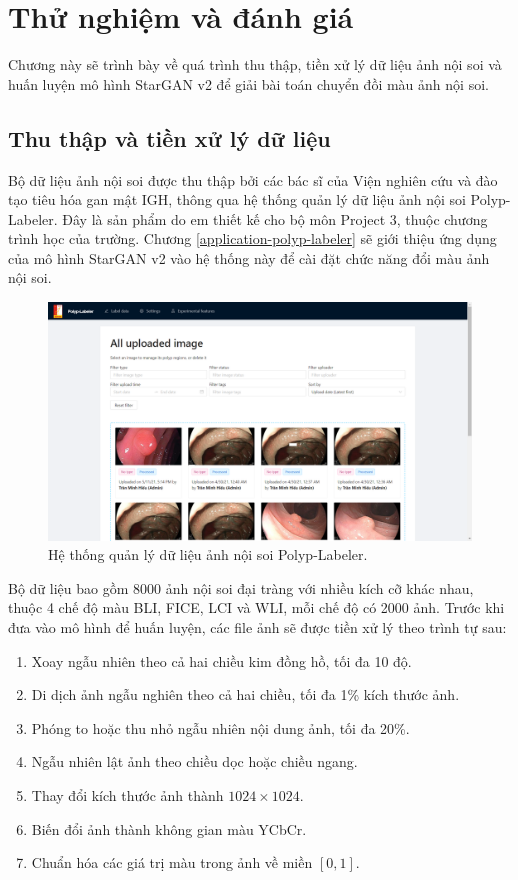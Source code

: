 \documentclass[12pt]{extreport}
\begin{document}
\chapter{Thử nghiệm và đánh giá}

Chương này sẽ trình bày về quá trình thu thập, tiền xử lý dữ liệu ảnh nội soi và huấn luyện mô hình StarGAN v2 để giải bài toán chuyển đồi màu ảnh nội soi.

\section{Thu thập và tiền xử lý dữ liệu}

Bộ dữ liệu ảnh nội soi được thu thập bởi các bác sĩ của Viện nghiên cứu và đào tạo tiêu hóa gan mật IGH, thông qua hệ thống quản lý dữ liệu ảnh nội soi Polyp-Labeler. Đây là sản phẩm do em thiết kế cho bộ môn Project 3, thuộc chương trình học của trường. Chương \ref{application-polyp-labeler} sẽ giới thiệu ứng dụng của mô hình StarGAN v2 vào hệ thống này để cài đặt chức năng đổi màu ảnh nội soi.

\begin{figure}[H]
    \centering
    \includegraphics[width=0.7\linewidth]{figure34.png}
    \caption{Hệ thống quản lý dữ liệu ảnh nội soi Polyp-Labeler.}
\end{figure}

Bộ dữ liệu bao gồm 8000 ảnh nội soi đại tràng với nhiều kích cỡ khác nhau, thuộc 4 chế độ màu BLI, FICE, LCI và WLI, mỗi chế độ có 2000 ảnh. Trước khi đưa vào mô hình để huấn luyện, các file ảnh sẽ được tiền xử lý theo trình tự sau:
\begin{enumerate}
    \item Xoay ngẫu nhiên theo cả hai chiều kim đồng hồ, tối đa 10 độ.
    \item Di dịch ảnh ngẫu nghiên theo cả hai chiều, tối đa 1\% kích thước ảnh.
    \item Phóng to hoặc thu nhỏ ngẫu nhiên nội dung ảnh, tối đa 20\%.
    \item Ngẫu nhiên lật ảnh theo chiều dọc hoặc chiều ngang.
    \item Thay đổi kích thước ảnh thành $ 1024 \times 1024 $.
    \item Biến đổi ảnh thành không gian màu YCbCr.
    \item Chuẩn hóa các giá trị màu trong ảnh về miền $ [0, 1] $.
\end{enumerate}
\end{document}
